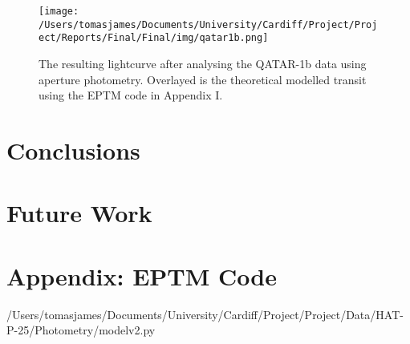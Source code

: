 \documentclass{report}
\begin{document}
\begin{figure}[H]
\centering
    \texttt{[image: /Users/tomasjames/Documents/University/Cardiff/Project/Project/Reports/Final/Final/img/qatar1b.png]}
\caption[The resulting lightcurve after analysing the QATAR-1b data using aperture photometry. Overlayed is the theoretical modelled transit using the EPTM code in Appendix I.]{The resulting lightcurve after analysing the QATAR-1b data using aperture photometry. Overlayed is the theoretical modelled transit using the EPTM code in Appendix I.} \label{qatar}
\end{figure}



\subsection{}



\section{Conclusions}


\section{Future Work}


\nocite{*}
\printbibliography


\appendix
\newpage
\section{Appendix: EPTM Code}


{/Users/tomasjames/Documents/University/Cardiff/Project/Project/Data/HAT-P-25/Photometry/modelv2.py}
\end{document}
